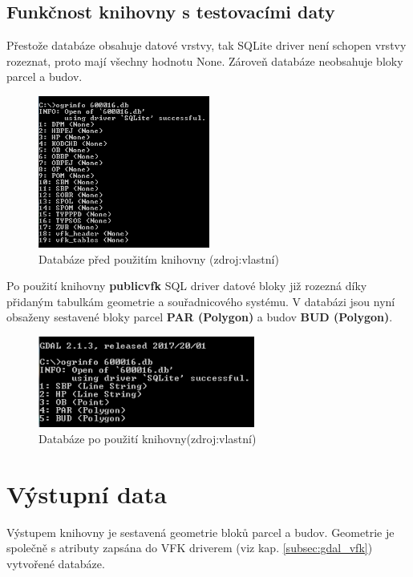 \subsection{Funkčnost knihovny s testovacími daty}

Přestože databáze obsahuje datové vrstvy, tak SQLite driver není schopen
vrstvy rozeznat, proto mají všechny hodnotu None. Zároveň databáze
neobsahuje bloky parcel a budov.
\begin{figure}[H]
	 \centering
      \includegraphics[height=5cm]{./pictures/funkcnost_knihovny_pred.png}
      \caption{Databáze před použitím knihovny (zdroj:vlastní)}
      \label{fig:funkcnost_pred}
\end{figure}

Po použití knihovny \textbf{publicvfk} SQL driver datové bloky již
rozezná díky přidaným tabulkám geometrie a souřadnicového systému. V
databázi jsou nyní obsaženy sestavené bloky parcel
\textbf{PAR (Polygon)} a budov \textbf{BUD (Polygon)}.
\begin{figure}[H]
	 \centering
     \includegraphics[height=3cm]{./pictures/funkcnost_knihovny_po.png}
     \caption{Databáze po použití knihovny(zdroj:vlastní)}
     \label{fig:funkcnost_po}
\end{figure}  
  
\section{Výstupní data}
Výstupem knihovny je sestavená geometrie bloků parcel a
budov. Geometrie je společně s atributy zapsána do VFK
driverem (viz kap. \ref{subsec:gdal_vfk}) vytvořené databáze.

